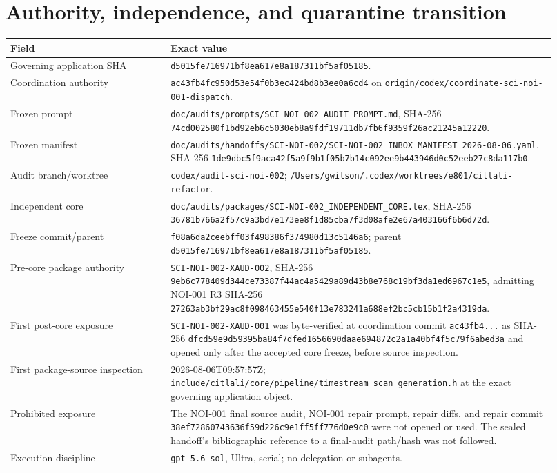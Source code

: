 \documentclass[11pt]{article}
\newcommand{\code}[1]{\nolinkurl{#1}}
\newcommand{\AuditGoverningSHA}{d5015fe716971bf8ea617e8a187311bf5af05185}
\newcommand{\AuditBranch}{codex/audit-sci-noi-002}
\newcommand{\AuditWorktree}{/Users/gwilson/.codex/worktrees/e801/citlali-refactor}
\newcommand{\AuditCorePath}{doc/audits/packages/SCI-NOI-002_INDEPENDENT_CORE.tex}
\newcommand{\AuditCoreSHA}{36781b766a2f57c9a3bd7e173ee8f1d85cba7f3d08afe2e67a403166f6b6d72d}
\newcommand{\AuditCoreFreezeCommit}{f08a6da2ceebff03f498386f374980d13c5146a6}
\begin{document}
\section{Authority, independence, and quarantine transition}

\begin{longtable}{L{0.27\linewidth}L{0.65\linewidth}}
\toprule
Field & Exact value\\
\midrule
Governing application SHA & \code{\AuditGoverningSHA}.\\
Coordination authority &
\code{ac43fb4fc950d53e54f0b3ec424bd8b3ee0a6cd4} on
\code{origin/codex/coordinate-sci-noi-001-dispatch}.\\
Frozen prompt &
\code{doc/audits/prompts/SCI_NOI_002_AUDIT_PROMPT.md}, SHA-256
\code{74cd002580f1bd92eb6c5030eb8a9fdf19711db7fb6f9359f26ac21245a12220}.\\
Frozen manifest &
\code{doc/audits/handoffs/SCI-NOI-002/SCI-NOI-002_INBOX_MANIFEST_2026-08-06.yaml},
SHA-256
\code{1de9dbc5f9aca42f5a9f9b1f05b7b14c092ee9b443946d0c52eeb27c8da117b0}.\\
Audit branch/worktree & \code{\AuditBranch}; \code{\AuditWorktree}.\\
Independent core & \code{\AuditCorePath}, SHA-256
\code{\AuditCoreSHA}.\\
Freeze commit/parent & \code{\AuditCoreFreezeCommit}; parent
\code{\AuditGoverningSHA}.\\
Pre-core package authority & \code{SCI-NOI-002-XAUD-002}, SHA-256
\code{9eb6c778409d344ce73387f44ac4a5429a89d43b8e768c19bf3da1ed6967c1e5},
admitting NOI-001 R3 SHA-256
\code{27263ab3bf29ac8f098463455e540f13e783241a688ef2bc5cb15b1f2a4319da}.\\
First post-core exposure & \code{SCI-NOI-002-XAUD-001} was byte-verified at
coordination commit \code{ac43fb4...} as SHA-256
\code{dfcd59e9d59395ba84f7dfed1656690daae694872c2a1a40bf4f5c79f6abed3a}
and opened only after the accepted core freeze, before source inspection.\\
First package-source inspection & 2026-08-06T09:57:57Z;
\code{include/citlali/core/pipeline/timestream_scan_generation.h} at the exact
governing application object.\\
Prohibited exposure & The NOI-001 final source audit, NOI-001 repair prompt,
repair diffs, and repair commit
\code{38ef72860743636f59d226c9e1ff5ff776d0e9c0} were not opened or used.  The
sealed handoff's bibliographic reference to a final-audit path/hash was not
followed.\\
Execution discipline & \code{gpt-5.6-sol}, Ultra, serial; no delegation or
subagents.\\
\bottomrule
\end{longtable}
\end{document}
